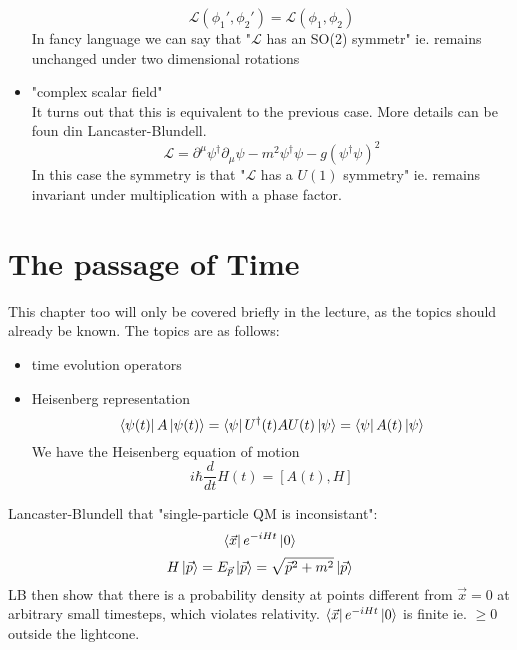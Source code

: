 \documentclass{report}
\begin{document}
\begin{itemize}
\[       \mathcal{L}\left( \phi_1', \phi_2' \right) = \mathcal{L}\left( \phi_1 , \phi_2 \right) 
       \] In fancy language we can say that "$\mathcal{L}$ has an SO(2) symmetr" ie. remains unchanged under two dimensional rotations\\
       \item "complex scalar field"\\
	       It turns out that this is equivalent to the previous case. More details can be foun din Lancaster-Blundell. \[
		       \mathcal{L} = \partial^\mu \psi^\dagger \partial_\mu \psi - m^2 \psi^\dagger \psi - g \left( \psi^\dagger \psi \right)^2  
	       \] In this case the symmetry is that "$\mathcal{L}$ has a $U(1)$ symmetry" ie. remains invariant under multiplication with a phase factor.
\end{itemize}
\chapter{The passage of Time}
This chapter too will only be covered briefly in the lecture, as the topics should already be known. The topics are as follows: 
\begin{itemize}
	\item time evolution operators
	\item Heisenberg representation \[
			\bra{\psi(t)} A \ket{\psi(t)} = \bra{\psi}U^\dagger(t) A U(t) \ket{\psi} = \bra{\psi }A(t)\ket{\psi}
	\] We have the Heisenberg equation of motion \[
	i\hbar \frac{d}{dt} H(t) = [A(t), H]
	\] 
\end{itemize}
Lancaster-Blundell that "single-particle QM is inconsistant": \[
	\bra{\vec{x}} e^{-i H t} \ket{0}
\] \[
H \ket{\vec{p}} = E_{\vec{p}} \ket{\vec{p}} = \sqrt{\vec{p}^2 + m^2} \ket{\vec{p}} 
\] LB then show that there is a probability density at points different from $\vec{x} = 0$ at arbitrary small timesteps, which violates relativity.  $\bra{\vec{x}} e^{-iHt} \ket{0}$ is finite ie. $\ge 0$ outside the lightcone.
\end{document}
